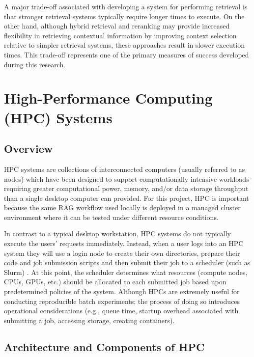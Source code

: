 A major trade-off associated with developing a system for performing retrieval is that stronger retrieval systems typically require longer times to execute. On the other hand, although hybrid retrieval and reranking may provide increased flexibility in retrieving contextual information by improving context selection relative to simpler retrieval systems, these approaches result in slower execution times. This trade-off represents one of the primary measures of success developed during this research.

\section{High-Performance Computing (HPC) Systems}

\subsection{Overview}

\ac{HPC} systems are collections of interconnected computers (usually referred to as nodes) which have been designed to support computationally intensive workloads requiring greater computational power, memory, and/or data storage throughput than a single desktop computer can provided. For this project, \ac{HPC} is important because the same \ac{RAG} workflow used locally is deployed in a managed cluster environment where it can be tested under different resource conditions.

In contrast to a typical desktop workstation, \ac{HPC} systems do not typically execute the users' requests immediately. Instead, when a user logs into an \ac{HPC} system they will use a login node to create their own directories, prepare their code and job submission scripts and then submit their job to a scheduler (such as Slurm) \cite{slurm2003}. At this point, the scheduler determines what resources (compute nodes, \acp{CPU}, \acp{GPU}, etc.) should be allocated to each submitted job based upon predetermined policies of the system. Although \acp{HPC} are extremely useful for conducting reproducible batch experiments; the process of doing so introduces operational considerations (e.g., queue time, startup overhead associated with submitting a job, accessing storage, creating containers).

\subsection{Architecture and Components of HPC}

